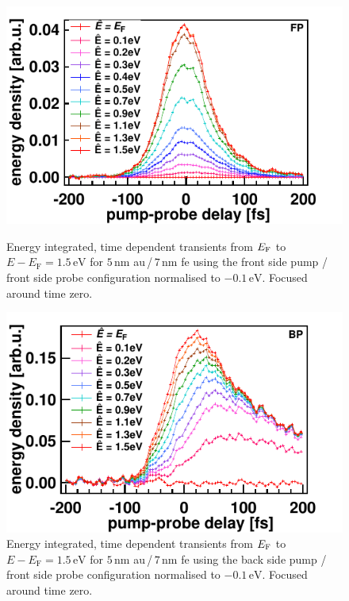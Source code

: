 \documentclass[a4paper,12pt,twoside]{article}
\begin{document}
	\begin{figure}[H]
		\begin{minipage}[t]{.45\linewidth}
			\includegraphics[width=\linewidth]{figures/FPtime.pdf}
			\caption{Energy integrated, time dependent transients from $E_{\rm{F}}$ to $E - E_\mathrm{F} = 1.5\,\mathrm{{eV}}$ for $5\,\mathrm{{nm}}$ \gls{au}\,/\,$7\,\mathrm{{nm}}$ \gls{fe} using the front side pump /\, front side probe configuration normalised to $-0.1\,\mathrm{{eV}}$. Focused around time zero.}
	    		\label{FPtime}
		\end{minipage}
	\hspace{.075\linewidth}
		\begin{minipage}[t]{.45\linewidth}
			\includegraphics[width=\linewidth]{figures/BPtime.pdf}
			\caption{Energy integrated, time dependent transients from $E_{\rm{F}}$ to $E - E_\mathrm{F} = 1.5\,\mathrm{{eV}}$ for $5\,\mathrm{{nm}}$ \gls{au}\,/\,$7\,\mathrm{{nm}}$ \gls{fe} using the back side pump /\, front side probe configuration normalised to $-0.1\,\mathrm{{eV}}$. Focused around time zero.}
	    		\label{BPtime}
		\end{minipage}
	\end{figure}
\end{document}
